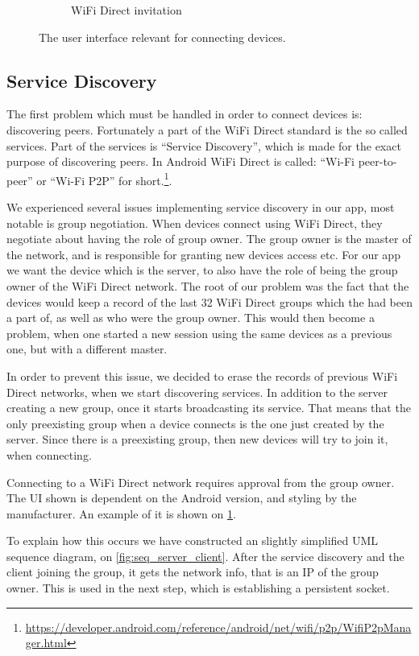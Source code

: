 \begin{figure}[ht]
\begin{subfigure}[b]{0.33\linewidth}
    \caption{WiFi Direct invitation}
    \label{fig:wifidirectinv}
    \vspace{4ex}
  \end{subfigure}
  \caption{The user interface relevant for connecting devices.}
  \label{fig:connecting}
\end{figure}

\subsection{Service Discovery}

The first problem which must be handled in order to connect devices is: discovering peers.
Fortunately a part of the WiFi Direct standard is the so called services.
Part of the services is ``Service Discovery'', which is made for the exact purpose of discovering peers.
In Android WiFi Direct is called: ``Wi-Fi peer-to-peer'' or ``Wi-Fi P2P'' for short.\footnote{\url{https://developer.android.com/reference/android/net/wifi/p2p/WifiP2pManager.html}}.

We experienced several issues implementing service discovery in our app, most notable is group negotiation.
When devices connect using WiFi Direct, they negotiate about having the role of group owner.
The group owner is the master of the network, and is responsible for granting new devices access etc.
For our app we want the device which is the server, to also have the role of being the group owner of the WiFi Direct network.
The root of our problem was the fact that the devices would keep a record of the last 32 WiFi Direct groups which the had been a part of, as well as who were the group owner.
This would then become a problem, when one started a new session using the same devices as a previous one, but with a different master.

In order to prevent this issue, we decided to erase the records of previous WiFi Direct networks, when we start discovering services.
In addition to the server creating a new group, once it starts broadcasting its service.
That means that the only preexisting group when a device connects is the one just created by the server.
Since there is a preexisting group, then new devices will try to join it, when connecting.

Connecting to a WiFi Direct network requires approval from the group owner.
The UI shown is dependent on the Android version, and styling by the manufacturer.
An example of it is shown on \cref{fig:wifidirectinv}.

To explain how this occurs we have constructed an slightly simplified UML sequence diagram, on \cref{fig:seq_server_client}.
After the service discovery and the client joining the group, it gets the network info, that is an IP of the group owner.
This is used in the next step, which is establishing a persistent socket.

